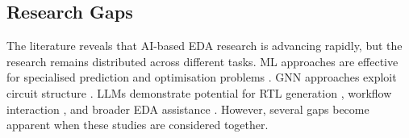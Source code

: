 \documentclass[conference]{IEEEtran}
\begin{document}
\subsection{
Research Gaps
}
\noindent The literature reveals that AI-based EDA research is advancing rapidly, but the research remains distributed across different tasks. ML approaches are effective for specialised prediction and optimisation problems \cite{P1_Huang2021,P2_Chen2023,P10_Fang2023,P8_Mirhoseini2021}. GNN approaches exploit circuit structure \cite{P3_Snchez2023}. LLMs demonstrate potential for RTL generation \cite{P4_Liu2025,P11_Thakur2024}, workflow interaction \cite{P5_Wu2024}, and broader EDA assistance \cite{P6_Pan2025,P7_He2025,P14_Liu2023ChipNeMo}. However, several gaps become apparent when these studies are considered together.\\
\end{document}
